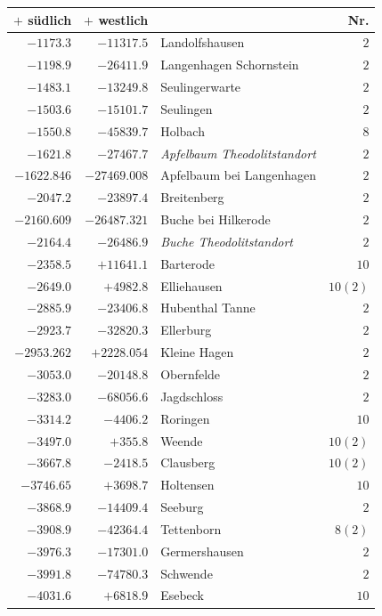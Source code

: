 \clearpage{}%
\begin{center}\begingroup\fontsize{8}{9}\selectfont
\setlength{\tabcolsep}{4pt}
\begin{tabular}{r|r|p{170pt}|r}\hline
\(+\) südlich&\(+\) westlich&&Nr.\\\hline
\(-1173.3\)&\(-11317.5\)&Landolfshausen&\(2\)\\
\(-1198.9\)&\(-26411.9\)&Langenhagen Schornstein&\(2\)\\
\(-1483.1\)&\(-13249.8\)&Seulingerwarte&\(2\)\\
\(-1503.6\)&\(-15101.7\)&Seulingen&\(2\)\\
\(-1550.8\)&\(-45839.7\)&Holbach&\(8\)\\
\(-1621.8\)&\(-27467.7\)&\textit{Apfelbaum Theodolitstandort}&\(2\)\\
\(-1622.846\)&\(-27469.008\)&Apfelbaum bei Langenhagen&\(2\)\\
\(-2047.2\)&\(-23897.4\)&Breitenberg&\(2\)\\
\(-2160.609\)&\(-26487.321\)&Buche bei Hilkerode&\(2\)\\
\(-2164.4\)&\(-26486.9\)&\textit{Buche Theodolitstandort}&\(2\)\\
\(-2358.5\)&\(+11641.1\)&Barterode&\(10\)\\
\(-2649.0\)&\(+4982.8\)&Elliehausen&\(10 (2)\)\\
\(-2885.9\)&\(-23406.8\)&Hubenthal Tanne&\(2\)\\
\(-2923.7\)&\(-32820.3\)&Ellerburg&\(2\)\\
\(-2953.262\)&\(+2228.054\)&Kleine Hagen&\(2\)\\
\(-3053.0\)&\(-20148.8\)&Obernfelde&\(2\)\\
\(-3283.0\)&\(-68056.6\)&Jagdschloss&\(2\)\\
\(-3314.2\)&\(-4406.2\)&Roringen&\(10\)\\
\(-3497.0\)&\(+355.8\)&Weende&\(10 (2)\)\\
\(-3667.8\)&\(-2418.5\)&Clausberg&\(10 (2)\)\\
\(-3746.65\)&\(+3698.7\)&Holtensen&\(10\)\\
\(-3868.9\)&\(-14409.4\)&Seeburg&\(2\)\\
\(-3908.9\)&\(-42364.4\)&Tettenborn&\(8 (2)\)\\
\(-3976.3\)&\(-17301.0\)&Germershausen&\(2\)\\
\(-3991.8\)&\(-74780.3\)&Schwende&\(2\)\\
\(-4031.6\)&\(+6818.9\)&Esebeck&\(10\)\\

\end{tabular}
\end{center}
